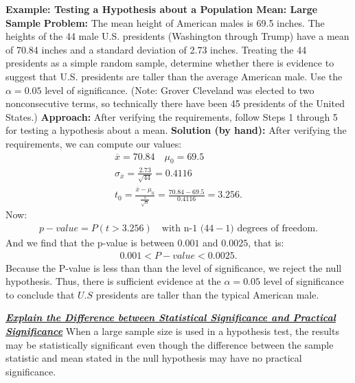 \documentclass{report}
\begin{document}
    \pagebreak \bigbreak \noindent 
    \bigbreak \noindent 
    \begin{mdframed}
      \textbf{Example: Testing a Hypothesis about a Population Mean: Large Sample}
      \bigbreak \noindent 
      \textbf{Problem:}
      The mean height of American males is 69.5 inches. The heights of the 44 male U.S. presidents (Washington through Trump) have a mean of 70.84 inches and a standard deviation of 2.73 inches. Treating the 44 presidents as a simple random sample, determine whether there is evidence to suggest that U.S. presidents are taller than the average American male. Use the $\alpha=0.05$ level of significance. (Note: Grover Cleveland was elected to two nonconsecutive terms, so technically there have been 45 presidents of the United States.)
      \bigbreak \noindent 
      \textbf{Approach:}
      After verifying the requirements, follow Steps 1 through 5 for testing a hypothesis about a mean.
      \bigbreak \noindent 
      \textbf{Solution (by hand):}
      \bigbreak \noindent 
      After verifying the requirements, we can compute our values:
      \begin{align*}
          \overline{x} = 70.84 \quad \mu_{0} = 69.5 \\
          \sigma_{\overline{x}} = \frac{2.73}{\sqrt{44}} = 0.4116 \\
          t_{0} = \frac{\overline{x}-\mu_{0}}{\frac{s}{\sqrt{n}}} = \frac{70.84-69.5}{0.4116} = 3.256
      .\end{align*}
      \bigbreak \noindent 
      Now:
      \begin{align*}
          p-value = P(t > 3.256) \quad \text{with n-1 ($44-1$) degrees of freedom}
      .\end{align*}
      \bigbreak \noindent 
      And we find that the p-value is between $0.001  $ and $0.0025$, that is:
      \begin{align*}
          0.001 < P-value < 0.0025
      .\end{align*}
      Because the P-value is less than than the level of significance, we reject the null hypothesis. Thus, there is sufficient evidence at the $\alpha = 0.05 $ level of significance to conclude that $U.S$ presidents are taller than the typical American male.
    \end{mdframed}
    \pagebreak \bigbreak \noindent 
    \textbf{\textit{\underline{Explain the Difference between Statistical Significance and Practical Significance}}}
    \bigbreak \noindent 
    When a large sample size is used in a hypothesis test, the results may be statistically significant even though the difference between the sample statistic and mean stated in the null hypothesis may have no practical significance.
\end{document}
